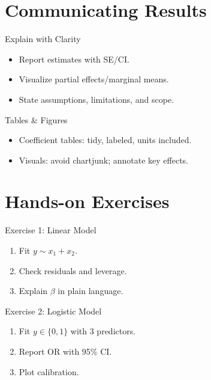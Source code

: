 \documentclass[aspectratio=169]{beamer}
\begin{document}
\section{Communicating Results}

\begin{frame}{Explain with Clarity}
\begin{itemize}
  \item Report estimates with SE/CI.
  \item Visualize partial effects/marginal means.
  \item State assumptions, limitations, and scope.
\end{itemize}
\end{frame}

\begin{frame}{Tables \& Figures}
\begin{itemize}
  \item Coefficient tables: tidy, labeled, units included.
  \item Visuals: avoid chartjunk; annotate key effects.
\end{itemize}
\end{frame}

\section{Hands-on Exercises}

\begin{frame}{Exercise 1: Linear Model}
\begin{enumerate}
  \item Fit $y \sim x_1 + x_2$.
  \item Check residuals and leverage.
  \item Explain $\beta$ in plain language.
\end{enumerate}
\end{frame}

\begin{frame}{Exercise 2: Logistic Model}
\begin{enumerate}
  \item Fit $y\in\{0,1\}$ with 3 predictors.
  \item Report OR with 95\% CI.
  \item Plot calibration.
\end{enumerate}
\end{frame}
\end{document}

